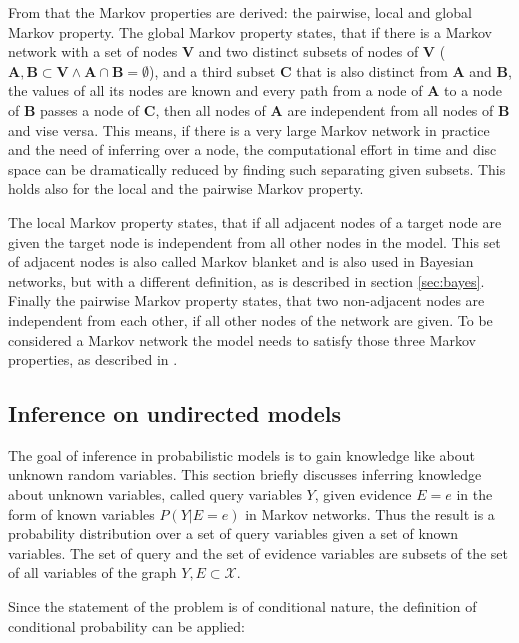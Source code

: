 From that the Markov properties are derived: the pairwise, local and global Markov property. The global Markov property states, that if there is a Markov network with a set of nodes $\mathbf{V}$ and two distinct subsets of nodes of $\mathbf{V}$ ($\mathbf{A}, \mathbf{B} \subset \mathbf{V} \wedge \mathbf{A} \cap \mathbf{B} = \emptyset$), and a third subset $\mathbf{C}$ that is also distinct from $\mathbf{A}$ and $\mathbf{B}$, the values of all its nodes are known and every path from a node of $\mathbf{A}$ to a node of $\mathbf{B}$ passes a node of $\mathbf{C}$, then all nodes of $\mathbf{A}$ are independent from all nodes of $\mathbf{B}$ and vise versa. This means, if there is a very large Markov network in practice and the need of inferring over a node, the computational effort in time and disc space can be dramatically reduced by finding such separating given subsets. This holds also for the local and the pairwise Markov property.

The local Markov property states, that if all adjacent nodes of a target node are given the target node is independent from all other nodes in the model. This set of adjacent nodes is also called Markov blanket and is also used in Bayesian networks, but with a different definition, as is described in section \ref{sec:bayes}. Finally the pairwise Markov property states, that two non-adjacent nodes are independent from each other, if all other nodes of the network are given. To be considered a Markov network the model needs to satisfy those three Markov properties, as described in \cite{markov1957theory}.


\subsection{Inference on undirected models} \label{sec:infer}

The goal of inference in probabilistic models is to gain knowledge like about unknown random variables. This section briefly discusses inferring knowledge about unknown variables, called query variables $Y$, given evidence $E=e$ in the form of known variables $P(Y|E=e)$ in Markov networks. Thus the result is a probability distribution over a set of query variables given a set of known variables. The set of query and the set of evidence variables are subsets of the set of all variables of the graph $Y,E \subset \mathcal{X}$.

Since the statement of the problem is of conditional nature, the definition of conditional probability can be applied:

